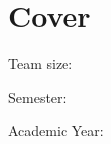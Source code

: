 \section*{Cover}
\thesistitle\par
\coursecode\quad\coursename\par
\studentAname\quad\studentAregno\par
\studentBname\quad\studentBregno\par
\studentCname\quad\studentCregno\par
\studentDname\quad\studentDregno\par
Team size: \teamsize\par
\programdegree\quad\programname\quad\specialization\par
Semester: \semester\par
Academic Year: \academicyear\par
\schoolname\par
\thesismonth\quad\thesisyear\par
\clearpage
